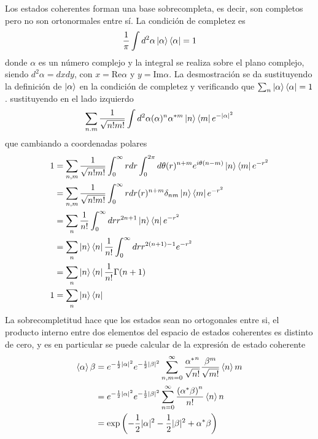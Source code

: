 Los estados coherentes forman una base sobrecompleta, es decir, son completos pero no son ortonormales entre sí. La condición de completez es
\begin{equation*}
  \frac{1}{\pi}\int d^2 \alpha \ket{\alpha}\bra{\alpha} = 1
\end{equation*}
donde $\alpha$ es un número complejo y la integral se realiza sobre el plano complejo, siendo $d^2\alpha = dxdy$, con $x = \mathrm{Re}\alpha$ y $y = \mathrm{Im}\alpha$. La desmostración se da sustituyendo la definición de $\ket{\alpha}$ en la condición de completez y verificando que $\sum_n \ket{\alpha}\bra{\alpha}=1$. sustituyendo en el lado izquierdo
\begin{equation*}
  \sum_{n.m} \frac{1}{\sqrt{n!m!}}\int d^2\alpha (\alpha)^n \alpha^{*m}\ket{n}\bra{m}e^{-|\alpha|^2}
\end{equation*}
que cambiando a coordenadas polares
\begin{align*}
  1 & = \sum_{n,m}\frac{1}{\sqrt{n!m!}}\int_0^{\infty} rdr \int_{0}^{2\pi}d\theta (r)^{n+m}e^{i\theta(n-m)}\ket{n}\bra{m}e^{-r^2} \\ & = \sum_{n,m}\frac{1}{\sqrt{n!m!}}\int_0^{\infty} rdr  (r)^{n+m} \delta_{nm} \ket{n}\bra{m}e^{-r^2} \\
    & = \sum_{n}\frac{1}{n!}\int_0^{\infty} dr  r^{2n+1} \ket{n}\bra{n}e^{-r^2}                                                   \\
    & = \sum_{n} \ket{n}\bra{n} \frac{1}{n!}\int_0^{\infty} dr  r^{2(n+1)-1} e^{-r^2}                                             \\
    & = \sum_{n} \ket{n}\bra{n} \frac{1}{n!} \Gamma(n+1)                                                                          \\
  1 & = \sum_{n} \ket{n}\bra{n}
\end{align*}
La sobrecompletitud hace que los estados sean no ortogonales entre si, el producto interno entre dos elementos del espacio de estados coherentes es distinto de cero, y es en particular se puede calcular de la expresión de estado coherente
\begin{align*}
  \braket{\alpha}{\beta} & = e^{-\frac{1}{2}|\alpha|^2} e^{-\frac{1}{2}|\beta|^2} \sum_{n,m=0}^{\infty} \frac{{\alpha^*}^n}{\sqrt{n!}}\frac{\beta^m}{\sqrt{m!}} \braket{n}{m} \\
                         & = e^{-\frac{1}{2}|\alpha|^2} e^{-\frac{1}{2}|\beta|^2} \sum_{n=0}^{\infty} \frac{{(\alpha^*\beta)}^n}{n!} \braket{n}{n}                            \\
                         & = \exp{\left( - \frac{1}{2}|\alpha|^2 - \frac{1}{2}|\beta|^2 + \alpha^*\beta \right)}
\end{align*}
